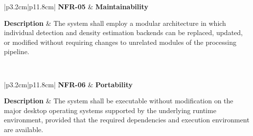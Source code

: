 
\begin{table}[H]
	\centering
	\renewcommand{\arraystretch}{1.25}
	\begin{tabular}{|p{3.2cm}|p{11.8cm}|}
		\hline
		\textbf{NFR-05} &
		\textbf{Maintainability} \\ \hline
		
		\textbf{Description} &
		The system shall employ a modular architecture in which individual detection and density estimation backends can be replaced, updated, or modified without requiring changes to unrelated modules of the processing pipeline. \\ \hline
		
		 \\ \hline
	\end{tabular}
	\caption{Non-functional requirement for system maintainability.}
	\label{tab:nfr05}
\end{table}


\begin{table}[H]
	\centering
	\renewcommand{\arraystretch}{1.25}
	\begin{tabular}{|p{3.2cm}|p{11.8cm}|}
		\hline
		\textbf{NFR-06} &
		\textbf{Portability} \\ \hline
		
		\textbf{Description} &
		The system shall be executable without modification on the major desktop operating systems supported by the underlying runtime environment, provided that the required dependencies and execution environment are available. \\ \hline
		
		 \\ \hline
	\end{tabular}
	\caption{Non-functional requirement for system portability.}
	\label{tab:nfr06}
\end{table}

